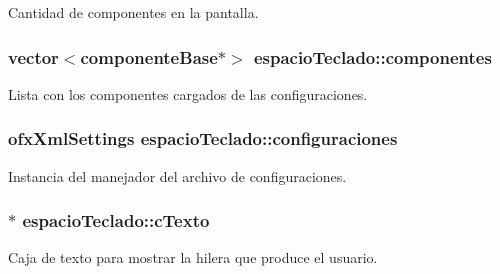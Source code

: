 Cantidad de componentes en la pantalla. 

\hypertarget{classespacio_teclado_aad1549ce795db466bad7c47a5f82582c}{}
\subsubsection[{componentes}]{\setlength{\rightskip}{0pt plus 5cm}vector$<${\bf componente\+Base}$\ast$$>$ espacio\+Teclado\+::componentes\hspace{0.3cm}{\ttfamily [private]}}\label{classespacio_teclado_aad1549ce795db466bad7c47a5f82582c}


Lista con los componentes cargados de las configuraciones. 

\hypertarget{classespacio_teclado_af215829331b2ed6d0a4485eab2a37311}{}
\subsubsection[{configuraciones}]{\setlength{\rightskip}{0pt plus 5cm}ofx\+Xml\+Settings espacio\+Teclado\+::configuraciones\hspace{0.3cm}{\ttfamily [private]}}\label{classespacio_teclado_af215829331b2ed6d0a4485eab2a37311}


Instancia del manejador del archivo de configuraciones. 

\hypertarget{classespacio_teclado_ac4d882599a627a2d26aa19280fb1cf28}{}
\subsubsection[{c\+Texto}]{$\ast$ espacio\+Teclado\+::c\+Texto\hspace{0.3cm}{\ttfamily [private]}}\label{classespacio_teclado_ac4d882599a627a2d26aa19280fb1cf28}


Caja de texto para mostrar la hilera que produce el usuario. 

\hypertarget{classespacio_teclado_aaa53bfd0abe00de252f38c299174f0d1}{}
